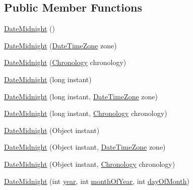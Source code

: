 \subsection*{Public Member Functions}
\begin{DoxyCompactItemize}
\item 
\hyperlink{classorg_1_1joda_1_1time_1_1_date_midnight_ac7bd87fabb9dd02d36d4a8622bcbf0b3}{Date\-Midnight} ()
\item 
\hyperlink{classorg_1_1joda_1_1time_1_1_date_midnight_ac7fa9efbc15a4de29b08d52bdb82e6a0}{Date\-Midnight} (\hyperlink{classorg_1_1joda_1_1time_1_1_date_time_zone}{Date\-Time\-Zone} zone)
\item 
\hyperlink{classorg_1_1joda_1_1time_1_1_date_midnight_aafc69dfbfce00b4515f51d25899dfd0b}{Date\-Midnight} (\hyperlink{classorg_1_1joda_1_1time_1_1_chronology}{Chronology} chronology)
\item 
\hyperlink{classorg_1_1joda_1_1time_1_1_date_midnight_a928a4a191dfebfe0074398b8ce33acdd}{Date\-Midnight} (long instant)
\item 
\hyperlink{classorg_1_1joda_1_1time_1_1_date_midnight_afebb8a090e14f9cb1978cecec5021fa7}{Date\-Midnight} (long instant, \hyperlink{classorg_1_1joda_1_1time_1_1_date_time_zone}{Date\-Time\-Zone} zone)
\item 
\hyperlink{classorg_1_1joda_1_1time_1_1_date_midnight_a192665b4d3f52d6fa43ceea128f6f5b6}{Date\-Midnight} (long instant, \hyperlink{classorg_1_1joda_1_1time_1_1_chronology}{Chronology} chronology)
\item 
\hyperlink{classorg_1_1joda_1_1time_1_1_date_midnight_a510ea0e772dcee65344cd33cda8cf1aa}{Date\-Midnight} (Object instant)
\item 
\hyperlink{classorg_1_1joda_1_1time_1_1_date_midnight_ad35e35c56ee2e848ddfd639231124b56}{Date\-Midnight} (Object instant, \hyperlink{classorg_1_1joda_1_1time_1_1_date_time_zone}{Date\-Time\-Zone} zone)
\item 
\hyperlink{classorg_1_1joda_1_1time_1_1_date_midnight_a56993bb4ce2e05801e4bad1a5a214ed3}{Date\-Midnight} (Object instant, \hyperlink{classorg_1_1joda_1_1time_1_1_chronology}{Chronology} chronology)
\item 
\hyperlink{classorg_1_1joda_1_1time_1_1_date_midnight_a61fe1e392423a9c086a7ee4bc78bec97}{Date\-Midnight} (int \hyperlink{classorg_1_1joda_1_1time_1_1_date_midnight_a01ec5ea504f50bf6338bfa8f40700bae}{year}, int \hyperlink{classorg_1_1joda_1_1time_1_1_date_midnight_a80f137963f1fbf273ac328d831eff685}{month\-Of\-Year}, int \hyperlink{classorg_1_1joda_1_1time_1_1_date_midnight_a051a9b4a5d9a944cabc3db73cc9d7417}{day\-Of\-Month})

\end{DoxyCompactItemize}
